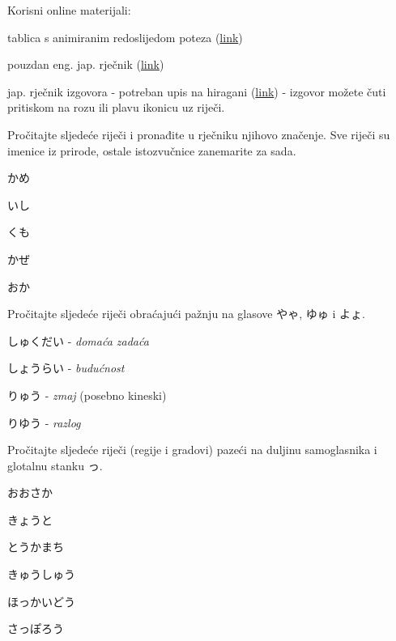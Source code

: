 
\author{autor}

	
	Korisni online materijali:
	\begin{hyou}
		\item tablica s animiranim redoslijedom poteza (\href{https://yosida.com/en/hiragana.html}{link})
		\item pouzdan eng. jap. rječnik (\href{https://jisho.org/}{link})
		\item jap. rječnik izgovora - potreban upis na hiragani (\href{http://www.gavo.t.u-tokyo.ac.jp/ojad/eng/search/index}{link}) - izgovor možete čuti pritiskom na rozu ili plavu ikonicu uz riječi.
	\end{hyou}
	
	\begin{mondai}{Pročitajte sljedeće riječi i pronađite u rječniku njihovo značenje. Sve riječi su imenice iz prirode, ostale istozvučnice zanemarite za sada.}
		\item かめ
		\item いし
		\item くも
		\item かぜ
		\item おか
	\end{mondai}

	\begin{mondai}{Pročitajte sljedeće riječi obraćajući pažnju na glasove やゃ, ゆゅ i よょ.}
		\item しゅくだい - \textit{domaća zadaća}
		\item しょうらい - \textit{budućnost}
		\item りゅう - \textit{zmaj} (posebno kineski)
		\item りゆう - \textit{razlog}
	\end{mondai}

	\begin{mondai}{Pročitajte sljedeće riječi (regije i gradovi) pazeći na duljinu samoglasnika i glotalnu stanku っ.}
		\item おおさか
		\item きょうと
		\item とうかまち
		\item きゅうしゅう
		\item ほっかいどう
		\item さっぽろう
	\end{mondai}

